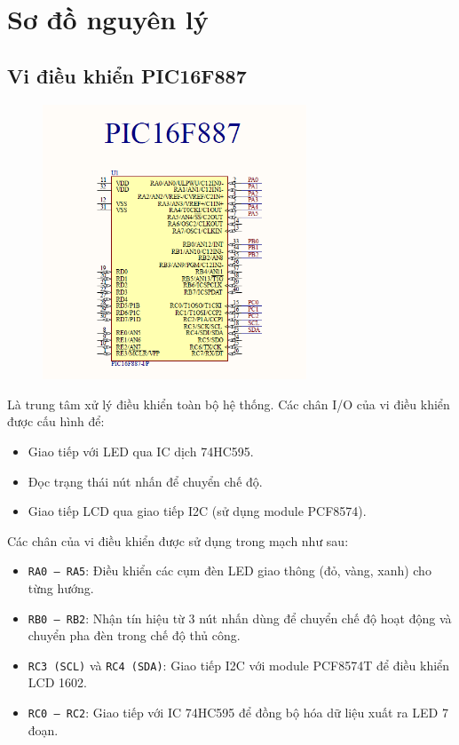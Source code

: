 \section{Sơ đồ nguyên lý}
\subsection{Vi điều khiển PIC16F887}
\begin{figure}[H]
    \centering
    \includegraphics[width=0.7\textwidth]{pictures/pic_sch.png}
\end{figure}
Là trung tâm xử lý điều khiển toàn bộ hệ thống. Các chân I/O của vi điều khiển được cấu hình để:
\begin{itemize}
    \item Giao tiếp với LED qua IC dịch 74HC595.
    \item Đọc trạng thái nút nhấn để chuyển chế độ.
    \item Giao tiếp LCD qua giao tiếp I2C (sử dụng module PCF8574).
\end{itemize}
Các chân của vi điều khiển được sử dụng trong mạch như sau:
\begin{itemize}
    \item \texttt{RA0 -- RA5}: Điều khiển các cụm đèn LED giao thông (đỏ, vàng, xanh) cho từng hướng.
    \item \texttt{RB0 -- RB2}: Nhận tín hiệu từ 3 nút nhấn dùng để chuyển chế độ hoạt động và chuyển pha đèn trong chế độ thủ công.
    \item \texttt{RC3 (SCL)} và \texttt{RC4 (SDA)}: Giao tiếp I2C với module PCF8574T để điều khiển LCD 1602.
    \item \texttt{RC0 -- RC2}: Giao tiếp với IC 74HC595 để đồng bộ hóa dữ liệu xuất ra LED 7 đoạn.
\end{itemize}

